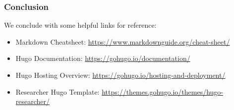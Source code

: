 \begin{frame}

    \frametitle{Conclusion}

    We conclude with some helpful links for reference:
    \bigskip

    \begin{itemize}
        \setlength\itemsep{2em}
        \item Markdown Cheatsheet: \url{https://www.markdownguide.org/cheat-sheet/}
        \item Hugo Documentation: \url{https://gohugo.io/documentation/}
        \item Hugo Hosting Overview: \url{https://gohugo.io/hosting-and-deployment/}
        \item Researcher Hugo Template: \url{https://themes.gohugo.io/themes/hugo-researcher/}
    \end{itemize}

\end{frame}